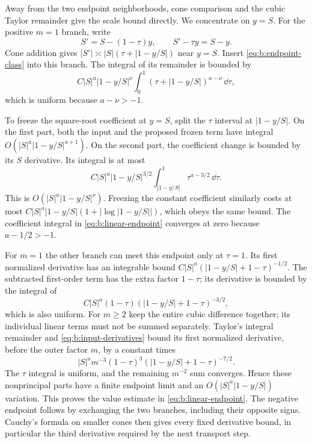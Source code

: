 \begin{prf}
Away from the two endpoint neighborhoods, cone comparison and the
cubic Taylor remainder give the scale bound directly. We concentrate
on $y=S$.
For the positive $m=1$ branch, write
\[
 S'=S-(1-\tau)y,\qquad
 S'-\tau y=S-y.
\]
Cone addition gives
$|S'|\asymp |S|(\tau+|1-y/S|)$ near $y=S$.
Insert \eqref{eq:b:endpoint-class} into this branch. The integral
of its remainder is bounded by
\[
 C|S|^a|1-y/S|^\nu
       \int_0^1(\tau+|1-y/S|)^{a-\nu}\,\dd\tau,
\]
which is uniform because $a-\nu>-1$.

To freeze the square-root coefficient at $y=S$, split the
$\tau$ interval at $|1-y/S|$. On the first part, both the input
and the proposed frozen term have integral
$O(|S|^a|1-y/S|^{a+1})$. On the second part, the coefficient
change is bounded by its $S$ derivative. Its integral is at most
\[
 C|S|^a|1-y/S|^{3/2}
      \int_{|1-y/S|}^1\tau^{a-3/2}\,\dd\tau.
\]
This is $O(|S|^a|1-y/S|^\nu)$. Freezing the constant coefficient
similarly costs at most
$C|S|^a|1-y/S|(1+|\log|1-y/S||)$, which obeys the same bound.
The coefficient integral in \eqref{eq:b:linear-endpoint} converges
at zero because $a-1/2>-1$.

For $m=1$ the other branch can meet this endpoint only at
$\tau=1$. Its first normalized derivative has an integrable bound
$C|S|^a(|1-y/S|+1-\tau)^{-1/2}$.
The subtracted first-order term has the extra factor $1-\tau$;
its derivative is bounded by the integral of
\[
 C|S|^a(1-\tau)
                  (|1-y/S|+1-\tau)^{-3/2},
\]
which is also uniform. For $m\geq2$ keep the entire cubic
difference together; its individual linear terms must not be
summed separately. Taylor's integral remainder and
\eqref{eq:b:input-derivatives} bound its first normalized derivative,
before the outer factor $m$, by a constant times
\[
 |S|^a m^{-3}(1-\tau)^3
                  (|1-y/S|+1-\tau)^{-7/2}.
\]
The $\tau$ integral is uniform, and the remaining $m^{-2}$ sum
converges. Hence these nonprincipal parts have a finite endpoint
limit and an $O(|S|^a|1-y/S|)$ variation. This proves the value
estimate in \eqref{eq:b:linear-endpoint}. The negative endpoint
follows by exchanging the two branches, including their opposite
signs. Cauchy's formula on smaller cones then gives every fixed
derivative bound, in particular the third derivative required by
the next transport step.
\end{prf}

